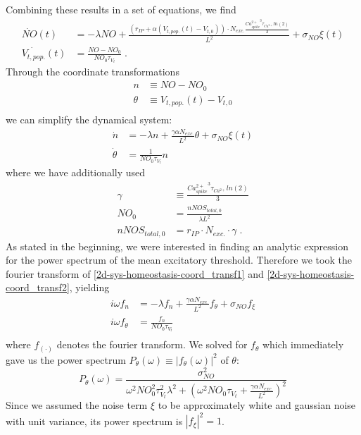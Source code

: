 \documentclass[10pt,a4paper]{article}
\begin{document}
Combining these results in a set of equations, we find
\begin{align}
\dot{NO}(t) &= -\lambda NO + \frac{(r_{IP} + \alpha(V_{t,pop.}(t)-V_{t,0}))\cdot N_{exc.}\frac{{Ca^{2+}_{spike}}^3 \tau_{Ca^{2+}}ln(2)}{3}}{L^2} + \sigma_{NO} \xi(t) \label{2d-sys-homeostasis1}\\
\dot{V_{t,pop.}}(t) &= \frac{NO-NO_0}{NO_0 \tau_{V_t}}\;. \label{2d-sys-homeostasis2}
\end{align}
Through the coordinate transformations
\begin{align}
n &\equiv NO-NO_0 \label{simplif_coord_transf1}\\
\theta &\equiv V_{t,pop.}(t)-V_{t,0} \label{simplif_coord_transf2}\\
\end{align}
we can simplify the dynamical system:
\begin{align}
\dot{n} &= -\lambda n + \frac{\gamma \alpha N_{exc.}}{L^2}\theta + \sigma_{NO} \xi(t) \label{2d-sys-homeostasis-coord_transf1}\\
\dot{\theta} &= \frac{1}{NO_0 \tau_{V_t}} n \label{2d-sys-homeostasis-coord_transf2}
\end{align}
where we have additionally used
\begin{align}
\gamma &\equiv \frac{{Ca^{2+}_{spike}}^3 \tau_{Ca^{2+}}ln(2)}{3} \label{2d-sys-fixed-points1}\\
NO_0 &= \frac{nNOS_{total,0}}{\lambda L^2} \label{2d-sys-fixed-points2}\\
nNOS_{total,0} &= r_{IP}\cdot N_{exc.} \cdot \gamma \; . \label{2d-sys-fixed-points3}
\end{align}
As stated in the beginning, we were interested in finding an analytic expression for the power spectrum of the mean excitatory threshold. Therefore we took the fourier transform of \eqref{2d-sys-homeostasis-coord_transf1} and \eqref{2d-sys-homeostasis-coord_transf2}, yielding
\begin{align}
i\omega f_n &= - \lambda f_n + \frac{\gamma \alpha N_{exc.}}{L^2}f_\theta + \sigma_{NO} f_{\xi} \label{2d-sys-homeostasis-coord_transf_ft1}\\
i\omega f_\theta &= \frac{f_n}{NO_0\tau_{V_t}} \label{2d-sys-homeostasis-coord_transf_ft2} \\
\end{align}
where $f_{(\cdot)}$ denotes the fourier transform. We solved for $f_\theta$ which immediately gave us the power spectrum $P_\theta (\omega) \equiv |f_\theta (\omega)|^2$ of $\theta$:
\begin{equation}
P_\theta (\omega) = \frac{\sigma_{NO}^2}{\omega^2 NO_0^2 \tau_{V_t}^2 \lambda^2 + \left( \omega^2 NO_0 \tau_{V_t} + \frac{\gamma \alpha N_{exc.}}{L^2}\right)^2} \label{Pow_Spec_Theta_Final}
\end{equation}
Since we assumed the noise term $\xi$ to be approximately white and gaussian noise with unit variance, its power spectrum is $|f_{\xi}|^2 = 1$.
\end{document}
